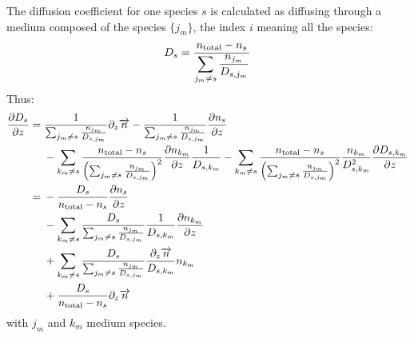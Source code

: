 The diffusion coefficient for one species $s$ is calculated as diffusing through
a medium composed of the species $\{j_m\}$, the index $i$ meaning all the
species:
\begin{equation}
D_s = \frac{n_\text{total} - n_s}{\displaystyle\sum_{j_m \neq s}\frac{n_{j_m}}{D_{s,j_m}}}
\label{Titan:Ds}
\end{equation}
Thus:
\begin{equation}
\begin{split}
\frac{\partial D_s}{\partial z} = &\;   \frac{1}{\sum_{j_m \neq s}\frac{n_{j_m}}{D_{s,j_m}}}\partial_{z}{\overrightarrow{n}} 
                        - \frac{1}{\sum_{j_m \neq s}\frac{n_{j_m}}{D_{s,j_m}}}\frac{\partial n_s}{\partial z} \\
                    &\; - \sum_{k_m\neq s}\frac{n_\text{total} - n_s}{\left(\sum_{j_m \neq s}\frac{n_{j_m}}{D_{s,j_m}}\right)^2}
                                \frac{\partial n_{k_m}}{\partial z}\frac{1}{D_{s,k_m}} 
                        -  \sum_{k_m\neq s}\frac{n_\text{total} - n_s}{\left(\sum_{j_m \neq s}\frac{n_{j_m}}{D_{s,j_m}}\right)^2} 
                                \frac{n_{k_m}}{D_{s,k_m}^2}\frac{\partial D_{s,k_m}}{\partial z}\\
                  = &\; - \frac{D_s}{n_\text{total} - n_s}\frac{\partial n_s}{\partial z} \\
                    &\; - \sum_{k_m\neq s}\frac{D_s}{\sum_{j_m \neq s}\frac{n_{j_m}}{D_{s,j_m}}}
                                \frac{1}{D_{s,k_m}} \frac{\partial n_{k_m}}{\partial z} \\
                    &\; +  \sum_{k_m\neq s}\frac{D_s}{\sum_{j_m \neq s}\frac{n_{j_m}}{D_{s,j_m}}} 
                                \frac{\partial_{z}{\overrightarrow{n}}}{D_{s,k_m}}n_{k_m} \\
                    &\; + \frac{D_s}{n_\text{total} - n_s}\partial_{z}{\overrightarrow{n}} \\
\end{split}
\label{Titan:dDs_dz}
\end{equation}
with $j_m$ and $k_m$ medium species.

